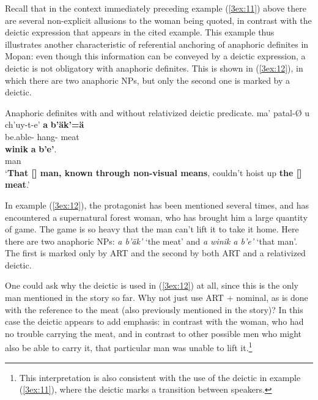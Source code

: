 \documentclass[output=paper]{langsci/langscibook}
\begin{document}
\label{3sec:3121}

Recall that in the context immediately preceding example (\ref{3ex:11}) above there are several non-explicit allusions to the woman being quoted, in contrast with the deictic expression that appears in the cited example. This example thus illustrates another characteristic of referential anchoring of anaphoric definites in Mopan: even though this information can be conveyed by a deictic expression, a deictic is not obligatory with anaphoric definites. This is shown in (\ref{3ex:12}), in which there are two anaphoric NPs, but only the second one is marked by a deictic.

\begin{exe}
\ex\label{3ex:12}
Anaphoric definites with and without relativized deictic predicate. 
\exi{}
\gll	ma'			patal-{\O}		u		ch'uy-t-e'			{\bf{a}}	{\bf{b'\"ak'=\"a}} \\
	{}	be.able-{}	{}	hang-{}	{}	meat{} \\
\glt
\exi{} 
	{\bf{winik}}		{\bf{a}}	{\bf{b'e'}}. \\
	{}	man			{}	{} \\
\glt	`{\bf{That [{}] man, known through non-visual means}}, couldn't hoist up {\bf{the [{}] meat}}.'
\end{exe}

In example (\ref{3ex:12}), the protagonist has been mentioned several times, and has encountered a supernatural forest woman, who has brought him a large quantity of game.  The game is so heavy that the man can't lift it to take it home.  Here there are two anaphoric NPs:  {\emph{a b'\"ak'}} `the meat' and {\emph{a winik a b'e'}} `that man'.  The first is marked only by ART and the second by both ART and a relativized deictic.

One could ask why the deictic is used in (\ref{3ex:12}) at all, since this is the only man mentioned in the story so far.  Why not just use ART + nominal, as is done with the reference to the meat (also previously mentioned in the story)?  In this case the deictic appears to add emphasis:  in contrast with the woman, who had no trouble carrying the meat, and in contrast to other possible men who might also be able to carry it, that particular man was unable to lift it.\footnote{This interpretation is also consistent with the use of the deictic in example (\ref{3ex:11}), where the deictic marks a transition between speakers.} 
\end{document}
